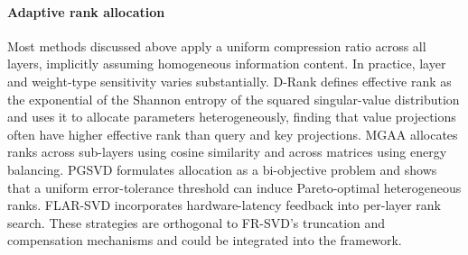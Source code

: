 \paragraph{Adaptive rank allocation}
Most methods discussed above apply a uniform compression ratio across all layers, implicitly assuming homogeneous information content. In practice, layer and weight-type sensitivity varies substantially. D-Rank \citep{mi2025drank} defines effective rank as the exponential of the Shannon entropy of the squared singular-value distribution and uses it to allocate parameters heterogeneously, finding that value projections often have higher effective rank than query and key projections. MGAA \citep{li2025mgaa} allocates ranks across sub-layers using cosine similarity and across matrices using energy balancing. PGSVD \citep{solgi2025pgsvd} formulates allocation as a bi-objective problem and shows that a uniform error-tolerance threshold can induce Pareto-optimal heterogeneous ranks. FLAR-SVD \citep{thoma2025flarsvd} incorporates hardware-latency feedback into per-layer rank search. These strategies are orthogonal to FR-SVD's truncation and compensation mechanisms and could be integrated into the framework.
